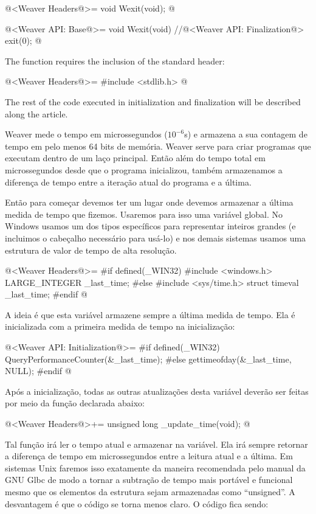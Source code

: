 \iniciocodigo
@<Weaver Headers@>=
void Wexit(void);
@
\fimcodigo

\iniciocodigo
@<Weaver API: Base@>=
void Wexit(void){
  //@<Weaver API: Finalization@>
  exit(0);
}
@
\fimcodigo

The  function requires the inclusion of the standard
header:

\iniciocodigo
@<Weaver Headers@>=
#include <stdlib.h>
@
\fimcodigo

The rest of the code executed in initialization and finalization will
be described along the article.


Weaver mede o tempo em microssegundos ($10^{-6}$s) e armazena a sua
contagem de tempo em pelo menos 64 bits de memória. Weaver serve para
criar programas que executam dentro de um laço principal. Então além
do tempo total em microssegundos desde que o programa inicializou,
também armazenamos a diferença de tempo entre a iteração atual do
programa e a última.

Então para começar devemos ter um lugar onde devemos armazenar a
última medida de tempo que fizemos. Usaremos para isso uma variável
global. No Windows usamos um dos tipos específicos para representar
inteiros grandes (e incluimos o cabeçalho necessário para usá-lo)
e nos demais sistemas usamos uma estrutura de valor de tempo de
alta resolução.

\iniciocodigo
@<Weaver Headers@>=
#if defined(_WIN32)
#include <windows.h>
LARGE_INTEGER _last_time;
#else
#include <sys/time.h>
struct timeval _last_time;
#endif
@
\fimcodigo

A ideia é que esta variável armazene sempre a última medida de
tempo. Ela é inicializada com a primeira medida de tempo na
inicialização:

\iniciocodigo
@<Weaver API: Initialization@>=
#if defined(_WIN32)
QueryPerformanceCounter(&_last_time);
#else
gettimeofday(&_last_time, NULL);
#endif
@
\fimcodigo

Após a inicialização, todas as outras atualizações desta variável
deverão ser feitas por meio da função declarada abaixo:

\iniciocodigo
@<Weaver Headers@>+=
unsigned long _update_time(void);
@
\fimcodigo

Tal função irá ler o tempo atual e armazenar na variável. Ela irá
sempre retornar a diferença de tempo em microssegundos entre a leitura
atual e a última. Em sistemas Unix faremos isso exatamente da maneira
recomendada pelo manual da GNU Glbc de modo a tornar a subtração de
tempo mais portável e funcional mesmo que os elementos da
estrutura  sejam armazenadas como ``unsigned''.  A
desvantagem é que o código se torna menos claro. O código fica sendo:


